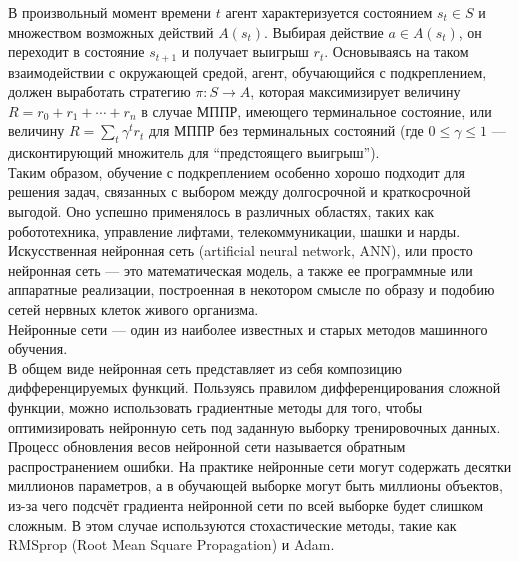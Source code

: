 В произвольный момент времени $t$ агент характеризуется состоянием $s_t \in S$ и множеством возможных действий $A(s_t)$. Выбирая действие $a \in A(s_t)$, он переходит в состояние $s_{t+1}$ и получает выигрыш $r_t$. Основываясь на таком взаимодействии с окружающей средой, агент, обучающийся с подкреплением, должен выработать стратегию $\pi: S \to A$, которая максимизирует величину$ R=r_0 + r_1+\cdots+r_n$ в случае МППР, имеющего терминальное состояние, или величину $R=\sum_t \gamma^t r_t$ для МППР без терминальных состояний (где $0 \leq \gamma \leq 1$ — дисконтирующий множитель для ``предстоящего выигрыш''). \\

Таким образом, обучение с подкреплением особенно хорошо подходит для решения задач, связанных с выбором между долгосрочной и краткосрочной выгодой. Оно успешно применялось в различных областях, таких как робототехника, управление лифтами, телекоммуникации, шашки и нарды. \\

Искусственная нейронная сеть (artificial neural network, ANN), или просто нейронная сеть — это математическая модель, а также ее программные или аппаратные реализации, построенная в некотором смысле по образу и подобию сетей нервных клеток живого организма. \\

Нейронные сети — один из наиболее известных и старых методов машинного обучения. \\

В общем виде нейронная сеть представляет из себя композицию дифференцируемых функций. Пользуясь правилом дифференцирования сложной функции, можно использовать градиентные методы для того, чтобы оптимизировать нейронную сеть под заданную выборку тренировочных данных. Процесс обновления весов нейронной сети называется обратным распространением ошибки. На практике нейронные сети могут содержать десятки миллионов параметров, а в обучающей выборке могут быть миллионы объектов, из-за чего подсчёт градиента нейронной сети по всей выборке будет слишком сложным. В этом случае используются стохастические методы, такие как RMSprop (Root Mean Square Propagation) и Adam. \\

